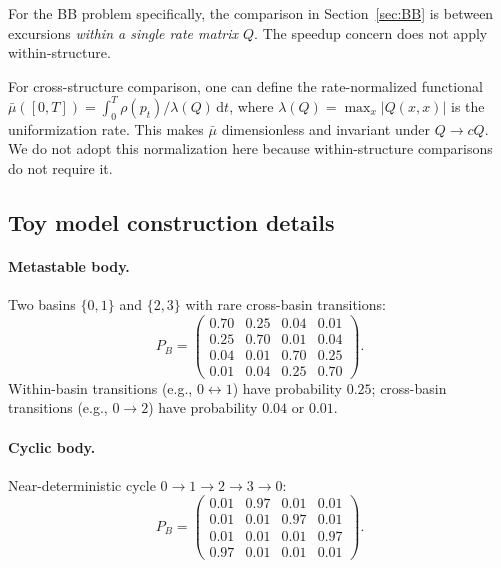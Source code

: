 \documentclass[12pt]{article}
\theoremstyle{remark}
\begin{document}
For the BB problem specifically, the comparison in Section~\ref{sec:BB} is between excursions \emph{within a single rate matrix $Q$}. The speedup concern does not apply within-structure.

For cross-structure comparison, one can define the rate-normalized functional $\bar{\mu}([0,T]) = \int_0^T \rho(p_t)/\lambda(Q)\,\mathrm{d}t$, where $\lambda(Q) = \max_x |Q(x,x)|$ is the uniformization rate. This makes $\bar{\mu}$ dimensionless and invariant under $Q \to cQ$. We do not adopt this normalization here because within-structure comparisons do not require it.

\subsection{Toy model construction details}\label{app:construction}

\paragraph{Metastable body.} Two basins $\{0,1\}$ and $\{2,3\}$ with rare cross-basin transitions:
\begin{equation}\label{eq:body-meta}
P_B = \begin{pmatrix}
0.70 & 0.25 & 0.04 & 0.01 \\
0.25 & 0.70 & 0.01 & 0.04 \\
0.04 & 0.01 & 0.70 & 0.25 \\
0.01 & 0.04 & 0.25 & 0.70
\end{pmatrix}.
\end{equation}
Within-basin transitions (e.g., $0 \leftrightarrow 1$) have probability $0.25$; cross-basin transitions (e.g., $0 \to 2$) have probability $0.04$ or $0.01$.

\paragraph{Cyclic body.} Near-deterministic cycle $0 \to 1 \to 2 \to 3 \to 0$:
\begin{equation}\label{eq:body-cycle}
P_B = \begin{pmatrix}
0.01 & 0.97 & 0.01 & 0.01 \\
0.01 & 0.01 & 0.97 & 0.01 \\
0.01 & 0.01 & 0.01 & 0.97 \\
0.97 & 0.01 & 0.01 & 0.01
\end{pmatrix}.
\end{equation}
\end{document}
